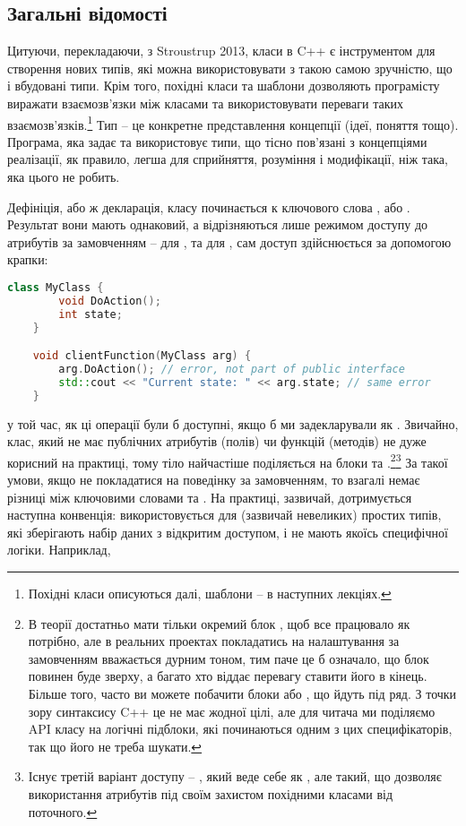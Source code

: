 \documentclass[12pt]{article}
\begin{document}
	\subsection{Загальні відомості}
	Цитуючи, перекладаючи, з Stroustrup 2013, класи в C++ є інструментом для створення нових типів, які можна використовувати з такою самою зручністю, що і вбудовані типи. Крім того, похідні класи та шаблони дозволяють програмісту виражати взаємозв'язки між класами та використовувати переваги таких взаємозв'язків.\footnote{Похідні класи описуються далі, шаблони -- в наступних лекціях.} Тип -- це конкретне представлення концепції (ідеї, поняття тощо). Програма, яка задає та використовує типи, що тісно пов'язані з концепціями реалізації, як правило, легша для сприйняття, розуміння і модифікації, ніж така, яка цього не робить.

	Дефініція, або ж декларація, класу починається к ключового слова , або . Результат вони мають однаковий, а відрізняються лише режимом доступу до атрибутів за замовченням --  для , та  для , сам доступ здійснюється за допомогою крапки:
	\begin{lstlisting}[language=c++]
	class MyClass {
		void DoAction();
		int state;
	}

	void clientFunction(MyClass arg) {
		arg.DoAction(); // error, not part of public interface
		std::cout << "Current state: " << arg.state; // same error
	}
	\end{lstlisting}
	у той час, як ці операції були б доступні, якщо б ми задекларували  як . Звичайно, клас, який не має публічних атрибутів (полів) чи функцій (методів) не дуже корисний на практиці, тому тіло найчастіше поділяється на блоки  та .\footnote{В теорії достатньо мати тільки окремий блок , щоб все працювало як потрібно, але в реальних проектах покладатись на налаштування за замовченням вважається дурним тоном, тим паче це б означало, що блок  повинен буде зверху, а багато хто віддає перевагу ставити його в кінець. Більше того, часто ви можете побачити блоки  або , що йдуть під ряд. З точки зору синтаксису C++ це не має жодної цілі, але для читача ми поділяємо API класу на логічні підблоки, які починаються одним з цих специфікаторів, так що його не треба шукати.}\footnote{Існує третій варіант доступу -- , який веде себе як , але такий, що дозволяє використання атрибутів під своїм захистом похідними класами від поточного.} За такої умови, якщо не покладатися на поведінку за замовченням, то взагалі немає різниці між ключовими словами  та . На практиці, зазвичай, дотримується наступна конвенція:  використовується для (зазвичай невеликих) простих типів, які зберігають набір даних з відкритим доступом, і не мають якоїсь специфічної логіки. Наприклад,
\end{document}
